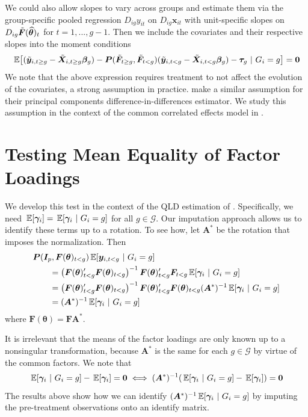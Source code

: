 \documentclass[12pt]{article}
\begin{document}
We could also allow slopes to vary across groups and estimate them via the group-specific pooled regression $D_{ig} y_{it}$ on $D_{ig} \bm x_{it}$ with unit-specific slopes on $D_{ig} \Tilde{\bm{F}}(\widehat{\bm{\theta}})_t$ for $t = 1,..., g-1$. Then we include the covariates and their respective slopes into the moment conditions
\begin{equation}
    \expec{(\tilde{\bm y}_{i,t\geq g} - \tilde{\bm X}_{i, t \geq g} \bm \beta_g) - \bm P(\tilde{\bm{F}}_{t \geq g}, \tilde{\bm{F}}_{t < g}) (\tilde{\bm y}_{i,t< g} - \tilde{\bm X}_{i, t < g} \bm \beta_g) - \bm \tau_g  }{G_i = g} = \bm 0
\end{equation}
We note that the above expression requires treatment to not affect the evolution of the covariates, a strong assumption in practice. \citet{Chan_and_Kwok_2022} make a similar assumption for their principal components difference-in-differences estimator. We study this assumption in the context of the common correlated effects model in \citet{Brown_Butts_Westerlund_2023}.


\section{Testing Mean Equality of Factor Loadings}

We develop this test in the context of the QLD estimation of \citet{Ahn_Lee_Schmidt_2013}. Specifically, we need $\expec{\bm \gamma_i} = \expec{\bm \gamma_i}{G_i = g}$ for all $g \in \mathcal{G}$. Our imputation approach allows us to identify these terms up to a rotation. To see how, let $\bm A^*$ be the rotation that imposes the \citet{Ahn_Lee_Schmidt_2013} normalization. Then
\begin{align*}
    &\bm P(\bm I_{p}, \bm{F}(\bm{\theta})_{t < g}) \expec{\bm y_{i, t < g}}{G_i = g} \\
    &\qquad= \left( \bm{F}(\bm{\theta})_{t < g}' \bm{F}(\bm{\theta})_{t < g} \right)^{-1} \bm{F}(\bm{\theta})_{t < g}' \bm{F}_{t < g} \expec{\bm \gamma_i}{G_i = g} \\
    &\qquad= \left( \bm{F}(\bm{\theta})_{t < g}' \bm{F}(\bm{\theta})_{t < g} \right)^{-1} \bm{F}(\bm{\theta})_{t < g}' \bm{F}(\bm{\theta})_{t < g} (\bm A^*)^{-1} \expec{\bm \gamma_i}{G_i = g} \\
    &\qquad= (\bm A^*)^{-1} \expec{\bm \gamma_i}{G_i = g}
\end{align*}
where $\bm{F}(\bm{\theta}) = \bm{F} \bm A^*$.

It is irrelevant that the means of the factor loadings are only known up to a nonsingular transformation, because $\bm A^*$ is the same for each $g \in \mathcal{G}$ by virtue of the common factors. We note that
\begin{equation}
    \expec{\bm \gamma_i}{G_i = g} - \expec{\bm \gamma_i} = \bm 0 \iff (\bm A^*)^{-1}(\expec{\bm \gamma_i}{G_i = g} - \expec{\bm \gamma_i}) = \bm 0
\end{equation}
The results above show how we can identify $(\bm A^*)^{-1} \expec{\bm \gamma_i}{G_i = g}$ by imputing the pre-treatment observations onto an identify matrix. 
\end{document}
